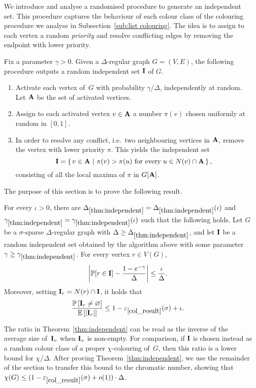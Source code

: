 

We introduce and analyse a randomised procedure to generate an independent set.
This procedure captures the behaviour of each colour class of the colouring procedure we analyse in Subsection~\ref{sub:list colouring}.
The idea is to assign to each vertex a random \emph{priority}
and resolve conflicting edges by removing the endpoint with lower priority.

Fix a parameter $\gamma>0$. Given a $\Delta$-regular graph $G=(V,E)$, the following procedure outputs a random independent set ${\bf{I}}$ of $G$.
\begin{enumerate} 
\item\label{samplestep1} Activate each vertex of~$G$ with probability $\gamma/\Delta$,
  independently at random.
  Let ${\bf{A}}$ be the set of activated vertices.
\item\label{samplestep2} Assign to each activated vertex $v\in {\bf{A}}$ a number $\pi(v)$
  chosen uniformly at random in $[0,1]$.
\item\label{samplestep3} In order to resolve any conflict, i.e.~two neighbouring vertices in ${\bf{A}}$,
  remove the vertex with lower priority $\pi$.
  This yields the independent set
  \[{\bf{I}}=\left\{\,v\in {\bf{A}} \,\,\middle|\,\, \pi(v) > \pi(u) \text{ for every }u \in N(v)\cap {\bf{A}}\,\right\},\]
  consisting of all the local maxima of $\pi$ in $G[{\bf{A}}]$.
\end{enumerate}

The purpose of this section is to prove the following result.
\begin{theorem}\label{thm:independent}
  For every $\iota>0$, there are $\Delta_{\ref{thm:independent}}=\Delta_{\ref{thm:independent}}(\iota)$
  and $\gamma_{\ref{thm:independent}}=\gamma_{\ref{thm:independent}}(\iota)$ such that the following holds.
  Let $G$ be a $\sigma$-sparse $\Delta$-regular graph with $\Delta\geq\Delta_{\ref{thm:independent}}$,
  and let
  ${\bf{I}}$ be a random independent set obtained by the algorithm above with some parameter
  $\gamma\geq\gamma_{\ref{thm:independent}}$.
  For every vertex $r\in V(G)$, 
\[
\left|\mathbb{P}[r\in {\bf{I}}]-\frac{1-e^{-\gamma}}{\Delta}\right|\leq \frac{\iota}{\Delta}.
\]
Moreover, setting ${\bf{I}}_r = N(r) \cap {\bf{I}}$, it holds that
  \[
  \frac{\mathbb{P}\left[{\bf{I}}_r \neq \varnothing\right]}{\mathbb{E}\left[|{\bf{I}}_r|\right]}
 \leq 
  1-\varepsilon_{\ref{col_result}}(\sigma)+\iota.
  \]
\end{theorem}
\noindent
The ratio in Theorem~\ref{thm:independent} can be read as the inverse of the average size of~${\bf{I}}_v$
when ${\bf{I}}_v$ is non-empty.
For comparison, if ${\bf{I}}$ is chosen instead as a random colour class of a proper $\chi$-colouring of~$G$, then this ratio is a lower bound for $\chi/\Delta$.
After proving Theorem~\ref{thm:independent}, we use the remainder of the section to transfer this bound to the chromatic number, showing that
$\chi(G)\leq (1-\varepsilon_{\ref{col_result}}(\sigma)+o(1))\cdot\Delta$.


